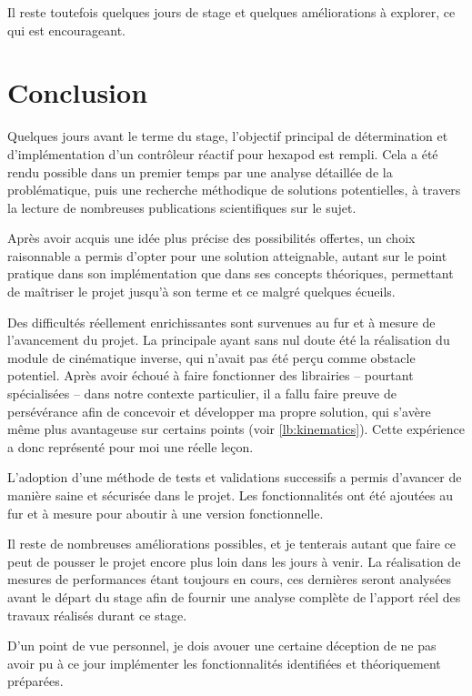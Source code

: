 \documentclass{tnreport}
\begin{document}
Il reste toutefois quelques jours de stage et quelques améliorations à explorer, ce qui est encourageant.

\chapter{Conclusion}

Quelques jours avant le terme du stage, l'objectif principal de détermination et d'implémentation d'un contrôleur réactif pour hexapod est rempli. Cela a été rendu possible dans un premier temps par une analyse détaillée de la problématique, puis une recherche méthodique de solutions potentielles, à travers la lecture de nombreuses publications scientifiques sur le sujet. 

Après avoir acquis une idée plus précise des possibilités offertes, un choix raisonnable a permis d'opter pour une solution atteignable, autant sur le point pratique dans son implémentation que dans ses concepts théoriques, permettant de maîtriser le projet jusqu'à son terme et ce malgré quelques écueils.

Des difficultés réellement enrichissantes sont survenues au fur et à mesure de l'avancement du projet. La principale ayant sans nul doute été la réalisation du module de cinématique inverse, qui n'avait pas été perçu comme obstacle potentiel. Après avoir échoué à faire fonctionner des librairies -- pourtant spécialisées -- dans notre contexte particulier, il a fallu faire preuve de persévérance afin de concevoir et développer ma propre solution, qui s'avère même plus avantageuse sur certains points (voir \ref{lb:kinematics}). Cette expérience a donc représenté pour moi une réelle leçon. 

L'adoption d'une méthode de tests et validations successifs a permis d'avancer de manière saine et sécurisée dans le projet. Les fonctionnalités ont été ajoutées au fur et à mesure pour aboutir à une version fonctionnelle. 

Il reste de nombreuses améliorations possibles, et je tenterais autant que faire ce peut de pousser le projet encore plus loin dans les jours à venir. La réalisation de mesures de performances étant toujours en cours, ces dernières seront analysées avant le départ du stage afin de fournir une analyse complète de l'apport réel des travaux réalisés durant ce stage.

D'un point de vue personnel, je dois avouer une certaine déception de ne pas avoir pu à ce jour implémenter les fonctionnalités identifiées et théoriquement préparées. 
\end{document}

